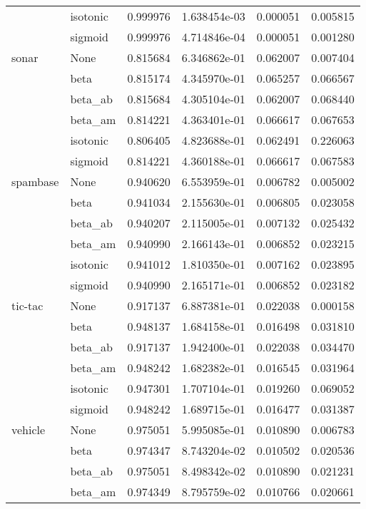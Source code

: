 \begin{tabular}{llrrrr}
        & isotonic &  0.999976 &  1.638454e-03 &  0.000051 &  0.005815 \\
        & sigmoid &  0.999976 &  4.714846e-04 &  0.000051 &  0.001280 \\
sonar & None &  0.815684 &  6.346862e-01 &  0.062007 &  0.007404 \\
        & beta &  0.815174 &  4.345970e-01 &  0.065257 &  0.066567 \\
        & beta\_ab &  0.815684 &  4.305104e-01 &  0.062007 &  0.068440 \\
        & beta\_am &  0.814221 &  4.363401e-01 &  0.066617 &  0.067653 \\
        & isotonic &  0.806405 &  4.823688e-01 &  0.062491 &  0.226063 \\
        & sigmoid &  0.814221 &  4.360188e-01 &  0.066617 &  0.067583 \\
spambase & None &  0.940620 &  6.553959e-01 &  0.006782 &  0.005002 \\
        & beta &  0.941034 &  2.155630e-01 &  0.006805 &  0.023058 \\
        & beta\_ab &  0.940207 &  2.115005e-01 &  0.007132 &  0.025432 \\
        & beta\_am &  0.940990 &  2.166143e-01 &  0.006852 &  0.023215 \\
        & isotonic &  0.941012 &  1.810350e-01 &  0.007162 &  0.023895 \\
        & sigmoid &  0.940990 &  2.165171e-01 &  0.006852 &  0.023182 \\
tic-tac & None &  0.917137 &  6.887381e-01 &  0.022038 &  0.000158 \\
        & beta &  0.948137 &  1.684158e-01 &  0.016498 &  0.031810 \\
        & beta\_ab &  0.917137 &  1.942400e-01 &  0.022038 &  0.034470 \\
        & beta\_am &  0.948242 &  1.682382e-01 &  0.016545 &  0.031964 \\
        & isotonic &  0.947301 &  1.707104e-01 &  0.019260 &  0.069052 \\
        & sigmoid &  0.948242 &  1.689715e-01 &  0.016477 &  0.031387 \\
vehicle & None &  0.975051 &  5.995085e-01 &  0.010890 &  0.006783 \\
        & beta &  0.974347 &  8.743204e-02 &  0.010502 &  0.020536 \\
        & beta\_ab &  0.975051 &  8.498342e-02 &  0.010890 &  0.021231 \\
        & beta\_am &  0.974349 &  8.795759e-02 &  0.010766 &  0.020661 \\

\end{tabular}
